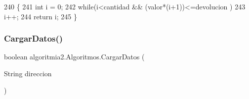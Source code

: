 \begin{DoxyCode}
240     \{
241     \textcolor{keywordtype}{int} i = 0;
242     \textcolor{keywordflow}{while}(i<cantidad && (valor*(i+1))<=devolucion )
243         i++;
244     \textcolor{keywordflow}{return} i;
245     \}
\end{DoxyCode}
\mbox{\label{classalgoritmia2_1_1_algoritmos_ab5d2d8385a30626622b05e83e9c1cd41}} 
\subsubsection{\texorpdfstring{Cargar\+Datos()}{CargarDatos()}}
{\footnotesize\ttfamily boolean algoritmia2.\+Algoritmos.\+Cargar\+Datos (\begin{DoxyParamCaption}\item[{String}]{direccion }\end{DoxyParamCaption})\hspace{0.3cm}{\ttfamily [inline]}}


